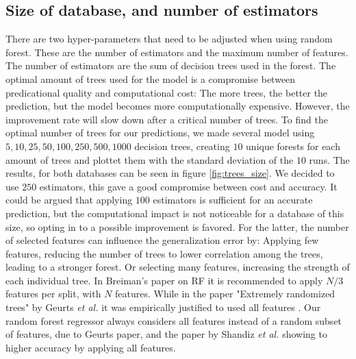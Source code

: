 \subsection{Size of database, and number of estimators}
	There are two hyper-parameters that need to be adjusted when using random forest. These are the number of estimators and the maximum number of features. The number of estimators are the sum of decision trees used in the forest. The optimal amount of trees used for the model is a compromise between predicational quality and computational cost: The more trees, the better the prediction, but the model becomes more computationally expensive. However, the improvement rate will slow down after a critical number of trees. To find the optimal number of trees for our predictions, we made several model using $5,10,25,50,100,250,500,1000$ decision trees, creating $10$ unique forests for each amount of trees and plottet them with the standard deviation of the $10$ runs. The results, for both databases can be seen in figure \ref{fig:trees_size}. We decided to use $250$ estimators, this gave a good compromise between cost and accuracy. It could be argued that applying $100$ estimators is sufficient for an accurate prediction, but the computational impact is not noticeable for a database of this size, so opting in to a possible improvement is favored. 
	 For the latter, the number of selected features can influence the generalization error by: Applying few features, reducing the number of trees to lower correlation among the trees, leading to a stronger forest. Or selecting many features, increasing the strength of each individual tree. In Breiman's paper on RF \cite{breiman2001random} it is recommended to apply $N/3$ features per split, with $N$ features. While in the paper "Extremely randomized trees" by Geurts \textit{et al.} it was empirically justified to used all features \cite{geurts2006extremely}. Our random forest regressor always considers all features instead of a random subset of features, due to Geurts paper, and the paper by Shandiz \textit{et al.} \cite{shandiz2016application} showing to higher accuracy by applying all features.


